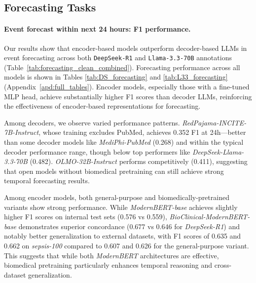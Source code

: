 \documentclass[letterpaper]{article} %
\begin{document}
\subsection{Forecasting Tasks}
\paragraph{Event forecast within next 24 hours: F1 performance.}

Our results show that encoder-based models outperform decoder-based LLMs in event forecasting across both \texttt{DeepSeek-R1} and \texttt{Llama-3.3-70B} annotations (Table~\ref{tab:forecasting_clean_combined}).
Forecasting performance across all models is shown in Tables \ref{tab:DS_forecasting} and \ref{tab:L33_forecasting} (Appendix~\ref{apd:full_tables}).
Encoder models, especially those with a fine-tuned MLP head, achieve substantially higher F1 scores than decoder LLMs, reinforcing the effectiveness of encoder-based representations for forecasting.

%
% 
Among decoders, we observe varied performance patterns. \textit{RedPajama-INCITE-7B-Instruct}, whose training excludes PubMed, achieves 0.352 F1 at 24h---better than some decoder models like \textit{MediPhi-PubMed} (0.268) and within the typical decoder performance range, though below top performers like \textit{DeepSeek-Llama-3.3-70B} (0.482). \textit{OLMO-32B-Instruct} performs competitively (0.411), suggesting that open models without biomedical pretraining can still achieve strong temporal forecasting results.

Among encoder models, both general-purpose and biomedically-pretrained variants show strong performance. While \textit{ModernBERT-base} achieves slightly higher F1 scores on internal test sets (0.576 vs 0.559), \textit{BioClinical-ModernBERT-base} demonstrates superior concordance (0.677 vs 0.646 for \textit{DeepSeek-R1}) and notably better generalization to external datasets, with F1 scores of 0.635 and 0.662 on \textit{sepsis-100} compared to 0.607 and 0.626 for the general-purpose variant. This suggests that while both \textit{ModernBERT} architectures are effective, biomedical pretraining particularly enhances temporal reasoning and cross-dataset generalization.
\end{document}
